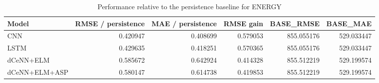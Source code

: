 \begin{table}
\caption{Performance relative to the persistence baseline for ENERGY}
\begin{tabular}{lrrrrr}
\toprule
Model & RMSE / persistence & MAE / persistence & RMSE gain & BASE\_RMSE & BASE\_MAE \\
\midrule
CNN & 0.420947 & 0.408699 & 0.579053 & 855.055176 & 529.033447 \\
LSTM & 0.429635 & 0.418251 & 0.570365 & 855.055176 & 529.033447 \\
dCeNN+ELM & 0.585672 & 0.642924 & 0.414328 & 855.512219 & 529.199574 \\
dCeNN+ELM+ASP & 0.580147 & 0.614738 & 0.419853 & 855.512219 & 529.199574 \\
\bottomrule
\end{tabular}
\end{table}
